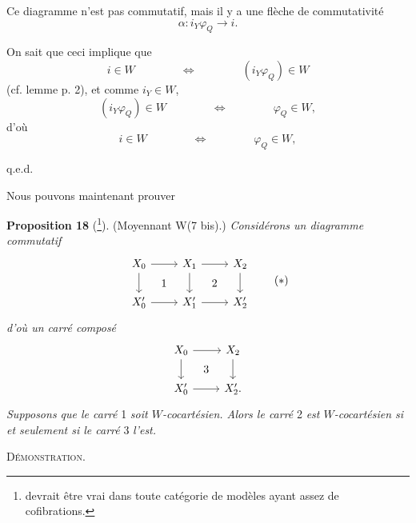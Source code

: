 \documentclass[11pt]{article}
\newcommand{\printedpage}[1]{\marginpar{\footnotesize p.~#1}}
\newcommand{\msp}[1]{\marginpar{\footnotesize [#1]}}
\begin{document}
\printedpage{151}

Ce diagramme n'est pas commutatif, mais il y a une flèche de commutativité
\[
\alpha : i_Y\varphi_Q \longrightarrow i.
\]

On sait que ceci implique que
\[
i \in W \qquad\qquad \Longleftrightarrow \qquad\qquad (i_Y\varphi_Q) \in W
\]
(cf. lemme p. 2), et comme $i_Y \in W$,
\[
(i_Y\varphi_Q) \in W \qquad\qquad \Longleftrightarrow \qquad\qquad \varphi_Q \in W,
\]
d'où
\[
i \in W \qquad\qquad \Longleftrightarrow \qquad\qquad \varphi_Q \in W,
\]

\hfill q.e.d.

Nous pouvons maintenant prouver

\msp{page 236}

\textbf{Proposition 18} (\footnote[127]{devrait être vrai dans toute catégorie de modèles ayant assez de cofibrations.}). (Moyennant W(7 bis).) \textit{Considérons un diagramme commutatif}
\[
\begin{tikzcd}[ampersand replacement=\&]
X_0 \arrow[r] \arrow[d] \arrow[rd, phantom, "1"] \& X_1 \arrow[r] \arrow[d] \arrow[rd, phantom, "2"] \& X_2 \arrow[d] \\
X'_0 \arrow[r] \& X'_1 \arrow[r] \& X'_2
\end{tikzcd}
\tag*{$(\ast)$}
\]
\textit{d'où un carré composé}
\[
\begin{tikzcd}[ampersand replacement=\&]
X_0 \arrow[r] \arrow[d] \arrow[rd, phantom, "3"] \& X_2 \arrow[d] \\
X'_0 \arrow[r] \& X'_2.
\end{tikzcd}
\]
\textit{Supposons que le carré} 1 \textit{soit $W$-cocartésien. Alors le carré} 2 \textit{est $W$-cocartésien si et seulement si le carré} 3 \textit{l'est.}

\textsc{Démonstration.}



\printedpage{152}
\end{document}
